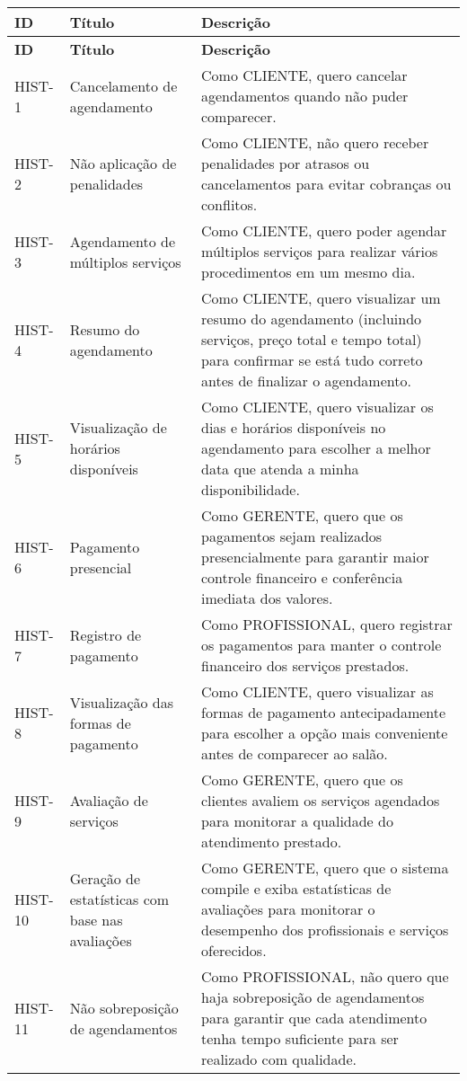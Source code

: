 \begin{longtable}{|p{2cm}|p{4cm}|p{9cm}|}
	\hline
	\textbf{ID} & \textbf{Título} & \textbf{Descrição} \\ \hline
	\endfirsthead
	
	\hline
	\textbf{ID} & \textbf{Título} & \textbf{Descrição} \\ \hline
	\endhead
	HIST-1 & Cancelamento de agendamento & Como CLIENTE, quero cancelar agendamentos quando não puder comparecer. \\ \hline
	HIST-2 & Não aplicação de penalidades & Como CLIENTE, não quero receber penalidades por atrasos ou cancelamentos para evitar cobranças ou conflitos. \\ \hline
	HIST-3 & Agendamento de múltiplos serviços & Como CLIENTE, quero poder agendar múltiplos serviços para realizar vários procedimentos em um mesmo dia. \\ \hline
	HIST-4 & Resumo do agendamento & Como CLIENTE, quero visualizar um resumo do agendamento (incluindo serviços, preço total e tempo total) para confirmar se está tudo correto antes de finalizar o agendamento. \\ \hline
	HIST-5 & Visualização de horários disponíveis & Como CLIENTE, quero visualizar os dias e horários disponíveis no agendamento para escolher a melhor data que atenda a minha disponibilidade. \\ \hline
	HIST-6 & Pagamento presencial & Como GERENTE, quero que os pagamentos sejam realizados presencialmente para garantir maior controle financeiro e conferência imediata dos valores. \\ \hline
	HIST-7 & Registro de pagamento & Como PROFISSIONAL, quero registrar os pagamentos para manter o controle financeiro dos serviços prestados. \\ \hline
	HIST-8 & Visualização das formas de pagamento & Como CLIENTE, quero visualizar as formas de pagamento antecipadamente para escolher a opção mais conveniente antes de comparecer ao salão. \\ \hline
	HIST-9 & Avaliação de serviços & Como GERENTE, quero que os clientes avaliem os serviços agendados para monitorar a qualidade do atendimento prestado. \\ \hline
	HIST-10 & Geração de estatísticas com base nas avaliações & Como GERENTE, quero que o sistema compile e exiba estatísticas de avaliações para monitorar o desempenho dos profissionais e serviços oferecidos. \\ \hline
	HIST-11 & Não sobreposição de agendamentos & Como PROFISSIONAL, não quero que haja sobreposição de agendamentos para garantir que cada atendimento tenha tempo suficiente para ser realizado com qualidade. \\ \hline

\end{longtable}
